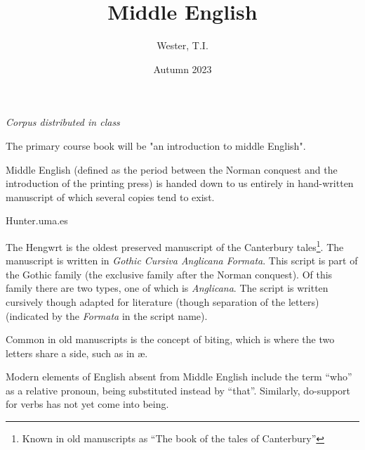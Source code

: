 \documentclass[12pt]{report}
\title{Middle English}
\date{Autumn 2023}
\author{Wester, T.I.}
\begin{document}
\maketitle
\tableofcontents

\chapter{}

\textit{Corpus distributed in class}

The primary course book will be "an introduction to middle English".

Middle English (defined as the period between the Norman conquest and the
introduction of the printing press) is handed down to us entirely in
hand-written manuscript of which several copies tend to exist.

Hunter.uma.es

The Hengwrt is the oldest preserved manuscript of the Canterbury
tales\footnote{Known in old manuscripts as ``The book of the tales of
Canterbury''}. The manuscript is written in \textit{Gothic Cursiva Anglicana
Formata}. This script is part of the Gothic family (the exclusive family after
the Norman conquest).  Of this family there are two types, one of which is
\textit{Anglicana}.  The script is written cursively though adapted for
literature (though separation of the letters) (indicated by the \textit{Formata}
in the script name).

Common in old manuscripts is the concept of biting, which is where the two
letters share a side, such as in \ae.

Modern elements of English absent from Middle English include the term ``who''
as a relative pronoun, being substituted instead by ``that''. Similarly,
do-support for verbs has not yet come into being.
\end{document}
